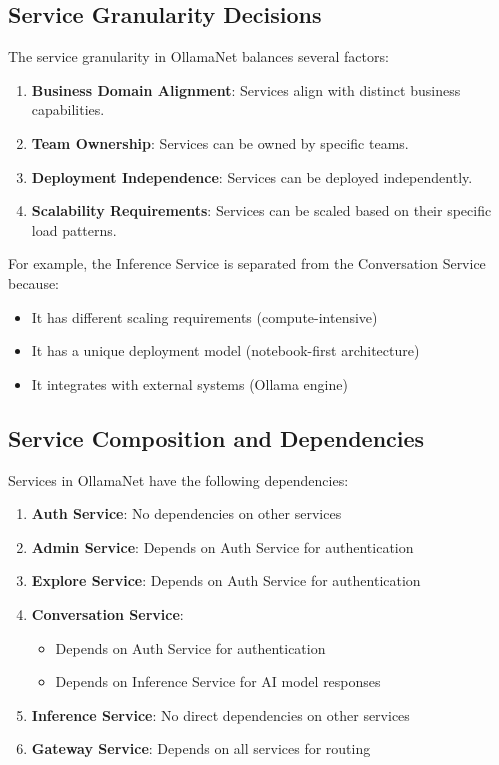 \subsection{Service Granularity Decisions}

The service granularity in OllamaNet balances several factors:

\begin{enumerate}
   \item \textbf{Business Domain Alignment}: Services align with distinct business capabilities.
   \item \textbf{Team Ownership}: Services can be owned by specific teams.
   \item \textbf{Deployment Independence}: Services can be deployed independently.
   \item \textbf{Scalability Requirements}: Services can be scaled based on their specific load patterns.
\end{enumerate}

For example, the Inference Service is separated from the Conversation Service because:
\begin{itemize}
   \item It has different scaling requirements (compute-intensive)
   \item It has a unique deployment model (notebook-first architecture)
   \item It integrates with external systems (Ollama engine)
\end{itemize}

\subsection{Service Composition and Dependencies}

Services in OllamaNet have the following dependencies:

\begin{enumerate}
   \item \textbf{Auth Service}: No dependencies on other services
   \item \textbf{Admin Service}: Depends on Auth Service for authentication
   \item \textbf{Explore Service}: Depends on Auth Service for authentication
   \item \textbf{Conversation Service}: 
   \begin{itemize}
      \item Depends on Auth Service for authentication
      \item Depends on Inference Service for AI model responses
   \end{itemize}
   \item \textbf{Inference Service}: No direct dependencies on other services
   \item \textbf{Gateway Service}: Depends on all services for routing
\end{enumerate}

